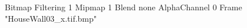 {Bitmap
	{Filtering 1}
	{Mipmap 1}
	{Blend none}
	{AlphaChannel 0}
	{Frame "HouseWall03_x.tif.bmp"}
}
